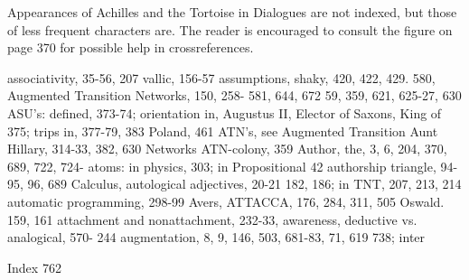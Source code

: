Appearances of Achilles and the Tortoise in Dialogues are not indexed, but those of less
frequent characters are. The reader is encouraged to consult the figure on page 370 for
possible help in crossreferences.

associativity, 35-56, 207                     vallic, 156-57
assumptions, shaky, 420, 422, 429. 580,       Augmented Transition Networks, 150, 258-
581, 644, 672                                 59, 359, 621, 625-27, 630
ASU's: defined, 373-74; orientation in,       Augustus II, Elector of Saxons, King of
375; trips in, 377-79, 383                    Poland, 461
ATN's,      see    Augmented    Transition    Aunt Hillary, 314-33, 382, 630
Networks ATN-colony, 359                      Author, the, 3, 6, 204, 370, 689, 722, 724-
atoms: in physics, 303; in Propositional      42 authorship triangle, 94-95, 96, 689
Calculus,                                     autological adjectives, 20-21
182, 186; in TNT, 207, 213, 214               automatic programming, 298-99 Avers,
ATTACCA, 176, 284, 311, 505                   Oswald. 159, 161
attachment and nonattachment, 232-33,         awareness, deductive vs. analogical, 570-
244 augmentation, 8, 9, 146, 503, 681-83,     71, 619
738; inter



Index                                                                                  762


